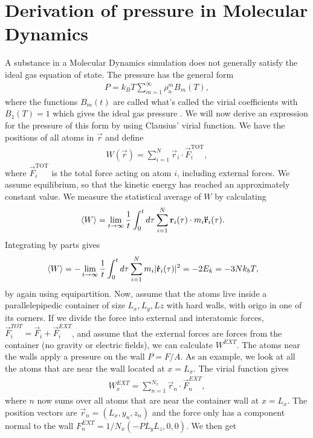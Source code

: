 \chapter{Derivation of pressure in Molecular Dynamics}
\label{sec:pressure_derivation}
A substance in a Molecular Dynamics simulation does not generally satisfy the ideal gas equation of state. The pressure has the general form
\begin{align}
    P = k_B T\sum_{m=1}^\infty \rho_n^mB_m(T),
\end{align}
where the functions $B_m(t)$ are called what's called the virial coefficients with $B_1(T) = 1$ which gives the ideal gas pressure \cite{ravndal2008statmech}. We will now derive an expression for the pressure of this form by using Clausius' virial function. We have the positions of all atoms in $\vec r$ and define 
\begin{align}
    W(\vec{r}) = \sum_{i=1}^N \vec r_i \cdot \vec F_i^\text{TOT},
\end{align}
where $\vec F_i^\text{TOT}$ is the total force acting on atom $i$, including external forces. We assume equilibrium, so that the kinetic energy has reached an approximately constant value. We measure the statistical average of $W$ by calculating
\begin{align}
    \langle W \rangle &= \lim_{t\rightarrow\infty} {1\over t} \int_0^t d\tau \sum_{i=1}^N \vec r_i(\tau) \cdot m_i \vec{\ddot r}_i(\tau).
\end{align}
Integrating by parts gives
\begin{align}
    \label{eq:virial_and_equi}
    \langle W \rangle &= -\lim_{t\rightarrow\infty} {1\over t} \int_0^t d\tau \sum_{i=1}^N m_i |\vec{\dot r}_i(\tau)|^2 = -2E_k = -3Nk_bT,
\end{align}
by again using equipartition. Now, assume that the atoms live inside a parallelepipedic container of size $L_x, L_y, Lz$ with hard walls, with origo in one of its corners. If we divide the force into external and interatomic forces, $\vec F_i^{TOT} = \vec F_i + \vec F_i^{EXT}$, and assume that the external forces are forces from the container (no gravity or electric fields), we can calculate $W^{EXT}$. The atoms near the walls apply a pressure on the wall $P = F/A$. As an example, we look at all the atoms that are near the wall located at $x=L_x$. The virial function gives
\begin{align}
    W^{EXT}_x = \sum_{n=1}^{N_x}\vec r_n\cdot \vec F_n^{EXT},
\end{align}
where $n$ now sums over all atoms that are near the container wall at $x=L_x$. The position vectors are $\vec r_n = (L_x, y_n, z_n)$ and the force only has a component normal to the wall $F_n^{EXT} = 1/N_x(-PL_yL_z, 0, 0)$. We then get
